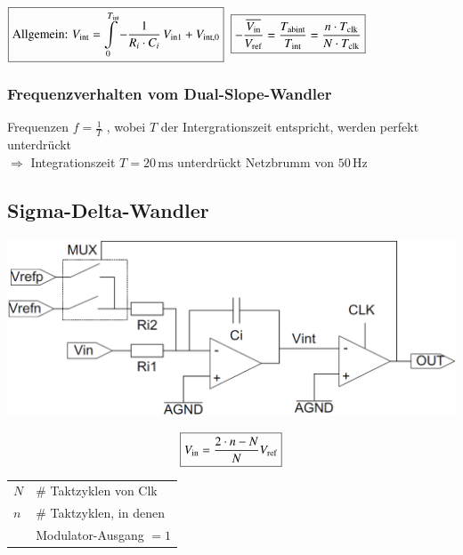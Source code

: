 $\boxed{\text{Allgemein: } V_{\rm int} = \int\limits_0^{T_{\rm int}} - \frac{1}{R_i \cdot C_i} \, V_{\rm in1} + V_{\rm int,0} }$
\quad 
$ \boxed{ -\frac{\overline{V_{\rm in}}}{V_{\rm ref}}= \frac{T_{\rm abint}}{T_{\rm int}} = \frac{n \cdot T_{\rm clk}}{N \cdot T_{\rm  clk} } }$




\subsubsection{Frequenzverhalten vom Dual-Slope-Wandler}

Frequenzen $f = \frac{1}{T}$ , wobei $T$ der Intergrationszeit entspricht, werden perfekt unterdrückt \\
$\Rightarrow$ Integrationszeit $T = 20 \, \mathrm{ms}$ unterdrückt Netzbrumm von $50 \, \mathrm{Hz}$


\subsection{Sigma-Delta-Wandler}


\begin{minipage}[c]{0.48\columnwidth}
    \includegraphics[width=\columnwidth]{images/sigma-delta-wandler.png}
\end{minipage}
\hfill
\begin{minipage}[c]{0.48\columnwidth}
    $$ \boxed{V_{\rm in} = \frac{2 \cdot n  - N}{N} V_{\rm ref}} $$

    \begin{tabular}{ll}
        $N$ & \# Taktzyklen von Clk \\
        $n$ & \# Taktzyklen, in denen \\
            & Modulator-Ausgang $=1$
    \end{tabular}
\end{minipage}
